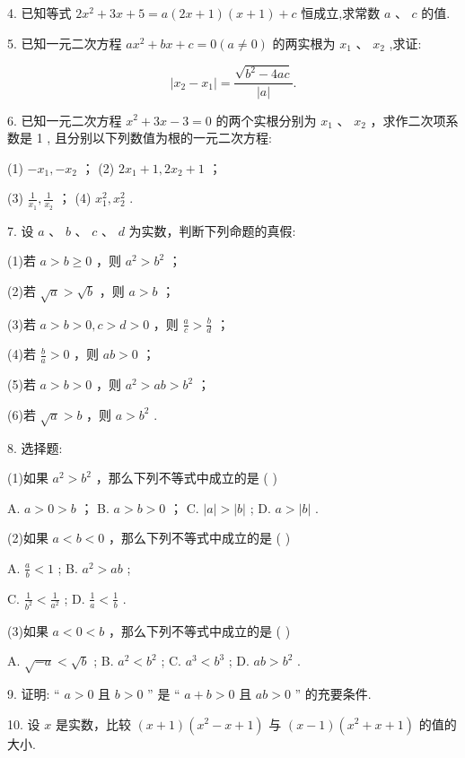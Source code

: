 \documentclass[10pt]{article}
\begin{document}
4. 已知等式 \(2{x}^{2} + {3x} + 5 = a\left( {{2x} + 1}\right) \left( {x + 1}\right)  + c\) 恒成立,求常数 \(a\text{ 、 }c\) 的值.

5. 已知一元二次方程 \(a{x}^{2} + {bx} + c = 0\left( {a \neq  0}\right)\) 的两实根为 \({x}_{1}\text{ 、 }{x}_{2}\) ,求证:

\[
\left| {{x}_{2} - {x}_{1}}\right|  = \frac{\sqrt{{b}^{2} - {4ac}}}{\left| a\right| }.
\]

6. 已知一元二次方程 \({x}^{2} + {3x} - 3 = 0\) 的两个实根分别为 \({x}_{1}\text{ 、 }{x}_{2}\) ，求作二次项系数是 1 , 且分别以下列数值为根的一元二次方程:

(1) \(- {x}_{1}, - {x}_{2}\) ； (2) \(2{x}_{1} + 1,2{x}_{2} + 1\) ；

(3) \(\frac{1}{{x}_{1}},\frac{1}{{x}_{2}}\) ； (4) \({x}_{1}^{2},{x}_{2}^{2}\) .

7. 设 \(a\text{ 、 }b\text{ 、 }c\text{ 、 }d\) 为实数，判断下列命题的真假:

(1)若 \(a > b \geq  0\) ，则 \({a}^{2} > {b}^{2}\) ；

(2)若 \(\sqrt{a} > \sqrt{b}\) ，则 \(a > b\) ；

(3)若 \(a > b > 0,c > d > 0\) ，则 \(\frac{a}{c} > \frac{b}{d}\) ；

(4)若 \(\frac{b}{a} > 0\) ，则 \({ab} > 0\) ；

(5)若 \(a > b > 0\) ，则 \({a}^{2} > {ab} > {b}^{2}\) ；

(6)若 \(\sqrt{a} > b\) ，则 \(a > {b}^{2}\) .

8. 选择题:

(1)如果 \({a}^{2} > {b}^{2}\) ，那么下列不等式中成立的是 ( )

A. \(a > 0 > b\) ； B. \(a > b > 0\) ； C. \(\left| a\right|  > \left| b\right|\) ; D. \(a > \left| b\right|\) .

(2)如果 \(a < b < 0\) ，那么下列不等式中成立的是 ( )

A. \(\frac{a}{b} < 1\) ; B. \({a}^{2} > {ab}\) ;

C. \(\frac{1}{{b}^{2}} < \frac{1}{{a}^{2}}\) ; D. \(\frac{1}{a} < \frac{1}{b}\) .

(3)如果 \(a < 0 < b\) ，那么下列不等式中成立的是 ( )

A. \(\sqrt{-a} < \sqrt{b}\) ; B. \({a}^{2} < {b}^{2}\) ; C. \({a}^{3} < {b}^{3}\) ; D. \({ab} > {b}^{2}\) .

9. 证明: “ \(a > 0\) 且 \(b > 0\) ” 是 “ \(a + b > 0\) 且 \({ab} > 0\) ” 的充要条件.

10. 设 \(x\) 是实数，比较 \(\left( {x + 1}\right) \left( {{x}^{2} - x + 1}\right)\) 与 \(\left( {x - 1}\right) \left( {{x}^{2} + x + 1}\right)\) 的值的大小.
\end{document}
